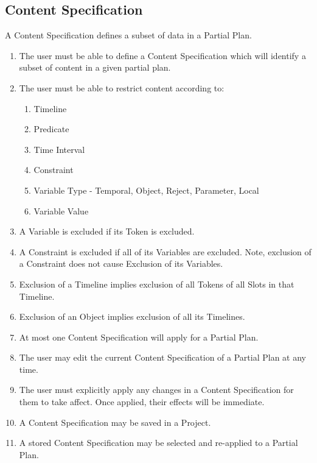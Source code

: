 \documentclass[twoside, 11pt]{article}
\begin{document}
\subsection{Content Specification}
A Content Specification defines a subset of data in a Partial Plan.
\begin{enumerate}
\item The user must be able to define a Content Specification which will identify a subset of content in a given partial plan.
\item The user must be able to restrict content according to:
\begin{enumerate}
\item Timeline
\item Predicate
\item Time Interval
\item Constraint
\item Variable Type - Temporal, Object, Reject, Parameter, Local
\item Variable Value
\end{enumerate}
\item A Variable is excluded if its Token is excluded.
\item A Constraint is excluded if all of its Variables are excluded. Note, exclusion of a Constraint does not cause Exclusion of its Variables.
\item Exclusion of a Timeline implies exclusion of all Tokens of all Slots in that Timeline.
\item Exclusion of an Object implies exclusion of all its Timelines. 
\item At most one Content Specification will apply for a Partial Plan.
\item The user may edit the current Content Specification of a Partial Plan at any time.
\item The user must explicitly apply any changes in a Content Specification for them to take affect. Once applied, their effects will be immediate.
\item A Content Specification may be saved in a Project.
\item A stored Content Specification may be selected and re-applied to a Partial Plan.
\end{enumerate}
\end{document}
